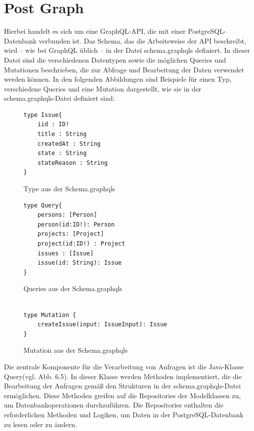 \section{Post Graph} %
\label{sec:postgraph}
Hierbei handelt es sich um eine GraphQL-API, die mit einer PostgreSQL-Datenbank verbunden ist. Das Schema, das die Arbeitsweise der API beschreibt, wird – wie bei GraphQL üblich – in der Datei schema.graphqls definiert. In dieser Datei sind die verschiedenen Datentypen sowie die möglichen Queries und Mutationen beschrieben, die zur Abfrage und Bearbeitung der Daten verwendet werden können. 
\noindent
In den folgenden Abbildungen sind Beispiele für einen Typ, verschiedene Queries und eine Mutation dargestellt, wie sie in der schema.graphqls-Datei definiert sind:
\begin{figure}[H]
\begin{center}
\begin{BVerbatim}
type Issue{
    iid : ID!
    title : String
    createdAt : String
    state : String
    stateReason : String
}
\end{BVerbatim}
\end{center}
\caption{Type aus der Schema.graphqls}
\end{figure}
\begin{figure}[H]
\begin{center}
\begin{BVerbatim}
type Query{
    persons: [Person]
    person(id:ID!): Person
    projects: [Project]
    project(id:ID!) : Project
    issues : [Issue]
    issue(id: String): Issue
}
\end{BVerbatim}
\end{center}
\caption{Queries aus der Schema.graphqls}
\end{figure}
\begin{figure}[H]
\begin{center}
\begin{BVerbatim}

type Mutation {
    createIssue(input: IssueInput): Issue
}
\end{BVerbatim}
\end{center}
\caption{Mutation aus der Schema.graphqls}
\end{figure}
\newpage
\noindent
Die zentrale Komponente für die Verarbeitung von Anfragen ist die Java-Klasse Query(vgl. Abb. 6.5). In dieser Klasse werden Methoden implementiert, die die Bearbeitung der Anfragen gemäß den Strukturen in der schema.graphqls-Datei ermöglichen. Diese Methoden greifen auf die Repositories der Modelklassen zu, um Datenbankoperationen durchzuführen. Die Repositories enthalten die erforderlichen Methoden und Logiken, um Daten in der PostgreSQL-Datenbank zu lesen oder zu ändern.
